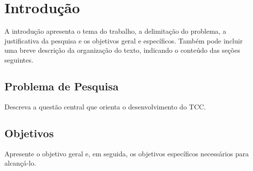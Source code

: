 \section{Introdução}
A introdução apresenta o tema do trabalho, a delimitação do problema, a justificativa da pesquisa e os objetivos geral e específicos. Também pode incluir uma breve descrição da organização do texto, indicando o conteúdo das seções seguintes.

\subsection{Problema de Pesquisa}
Descreva a questão central que orienta o desenvolvimento do TCC.

\subsection{Objetivos}
Apresente o objetivo geral e, em seguida, os objetivos específicos necessários para alcançá-lo.